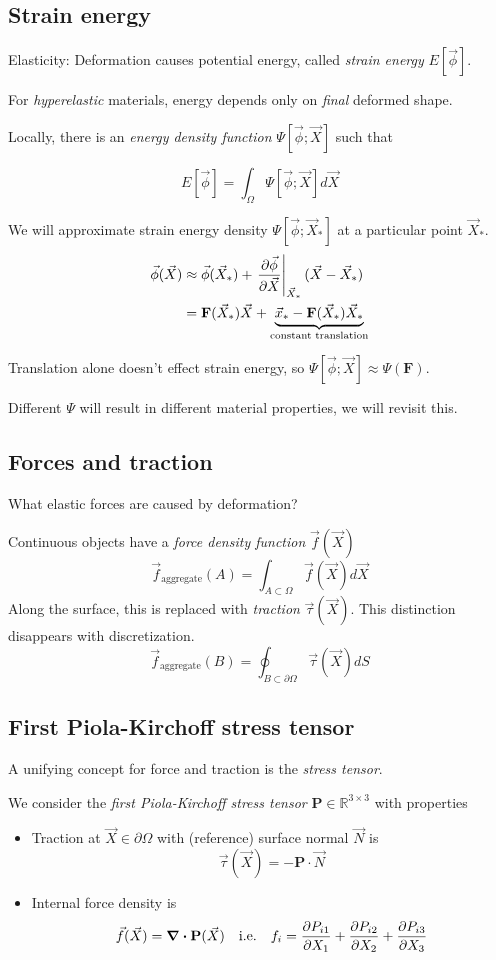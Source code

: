 \documentclass{article}
\newcommand{\Rx}[2]{\ensuremath{\mathbb{R}^{#1 \times #2}}}
\newcommand{\vxstar}{\ensuremath{\vec{x}_*}}
\newcommand{\vX}{\ensuremath{\vec{X}}}
\newcommand{\vXstar}{\ensuremath{\vec{X}_*}}
\newcommand{\vphi}{\ensuremath{\vec{\phi}}}
\newcommand{\vphiX}{\ensuremath{\vec{\phi}(\vX)}}
\newcommand{\vphiXstar}{\ensuremath{\vec{\phi}(\vXstar)}}
\newcommand{\F}{\ensuremath{\mathbf{F}}}
\newcommand{\Ephi}{\ensuremath{E[\vphi]}}
\newcommand{\PsiphiX}{\ensuremath{\Psi[\vphi; \vX]}}
\newcommand{\PsiphiXstar}{\ensuremath{\Psi[\vphi; \vXstar]}}
\newcommand{\PsiF}{\ensuremath{\Psi(\F)}}
\newcommand{\vf}{\ensuremath{\vec{f}}}
\newcommand{\fX}{\ensuremath{\vf(\vX)}}
\newcommand{\tauX}{\ensuremath{\vec{\tau}(\vX)}}
\newcommand{\fagg}{\ensuremath{\vec{f}_{\text{aggregate}}}}
\renewcommand{\P}{\ensuremath{\mathbf{P}}}
\begin{document}
\pagebreak
\subsection{Strain energy}

Elasticity: Deformation causes potential energy, called \emph{strain energy} $\Ephi$.

For \emph{hyperelastic} materials, energy depends only on \emph{final} deformed shape.

Locally, there is an \emph{energy density function} $\PsiphiX$ such that

$$\Ephi = \int_\Omega \PsiphiX d\vX$$

\pagebreak
We will approximate strain energy density $\PsiphiXstar$ at a particular point $\vXstar$.
\begin{align*}
  \vphiX & \approx \vphiXstar + \left. \pdv{\vphi}{\vX} \right\rvert_{\vXstar} (\vX - \vXstar)        \\
         & = \F(\vXstar)\vX + \underbrace{\vxstar - \F(\vXstar)\vXstar}_{\text{constant translation}}
\end{align*}

Translation alone doesn't effect strain energy, so $\PsiphiX \approx \PsiF$.

Different $\Psi$ will result in different material properties, we will revisit this.

\pagebreak
\subsection{Forces and traction}
What elastic forces are caused by deformation?

Continuous objects have a \emph{force density function} $\fX$
$$\fagg(A) = \int_{A \subset \Omega} \fX d\vX$$
Along the surface, this is replaced with \emph{traction} $\tauX$. This distinction
disappears with discretization.
$$\fagg(B) = \oint_{B \subset \partial \Omega} \tauX dS$$

\pagebreak
\subsection{First Piola-Kirchoff stress tensor}
A unifying concept for force and traction is the \emph{stress tensor}.

We consider the \emph{first Piola-Kirchoff stress tensor} $\P \in \Rx{3}{3}$ with properties

\begin{itemize}
  \item Traction at $\vX \in \partial\Omega$ with (reference) surface normal
        $\vec{N}$ is $$\tauX = -\P \cdot \vec{N}$$
  \item Internal force density is
        $$\fX = \div{\P(\vX)} \quad \text{i.e.} \quad f_i = \pdv{P_{i1}}{X_1} + \pdv{P_{i2}}{X_2} + \pdv{P_{i3}}{X_3} $$
\end{itemize}
\end{document}
